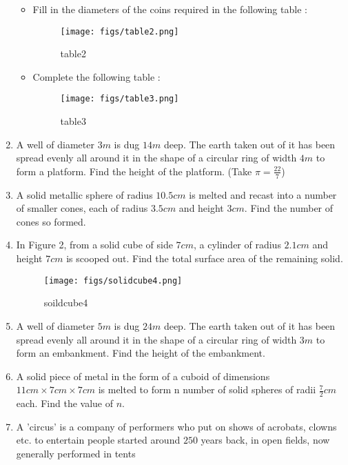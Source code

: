 \documentclass{article}
\begin{document}
\begin{enumerate}
    \begin{itemize}
     \item   Fill in the diameters of the coins required in the following table :
    \begin{figure}[H]
        \centering
        \texttt{[image: figs/table2.png]}
        \caption{table2}
        \label{tab:table2}
    \end{figure}
    \item Complete the following table :
\begin{figure}[H]
    \centering
	\texttt{[image: figs/table3.png]}
    \caption{table3}
    \label{tab:table3}
\end{figure}
\end{itemize}
\newpage
\item A well of diameter $3 m$ is dug $14 m$ deep. The earth 
       taken out of it has been spread evenly all around it in the shape of a circular ring of width
        $4 m$ to form a platform. Find the height of the platform. (Take $\pi=\frac{22}{7}$)

\item  A solid metallic sphere of radius $10.5 cm$ is melted and recast into a number of smaller cones, each of radius $3.5 cm$ and height $3 cm$. Find the number of cones so formed.

\item  In Figure 2, from a solid cube of side $7 cm$, a cylinder of radius $2.1 cm$ and height $7 cm$ is scooped out. Find the total surface area of the remaining solid.
\begin{figure}[H]
\centering
\texttt{[image: figs/solidcube4.png]}
\caption{soildcube4}
\label{fig:solidcube4}
\end{figure}

\item  A well of diameter $5 m$ is dug $24 m$ deep. The earth taken out of it has been spread evenly all around it in the shape of a circular ring of width $3 m$ to form an embankment. Find the height of the embankment.

 \item  A solid piece of metal in the form of a cuboid of dimensions $11 cm\times 7 cm\times 7 cm$ is melted to form n number of solid spheres of radii $\frac{7}{2}cm$ each. Find the value of $n$.
\newpage     
\item  A 'circus' is a company of performers who put on shows of acrobats, clowns etc. to entertain people started around $250$ years back, in open fields, now generally performed in tents


\end{enumerate}
\end{document}
